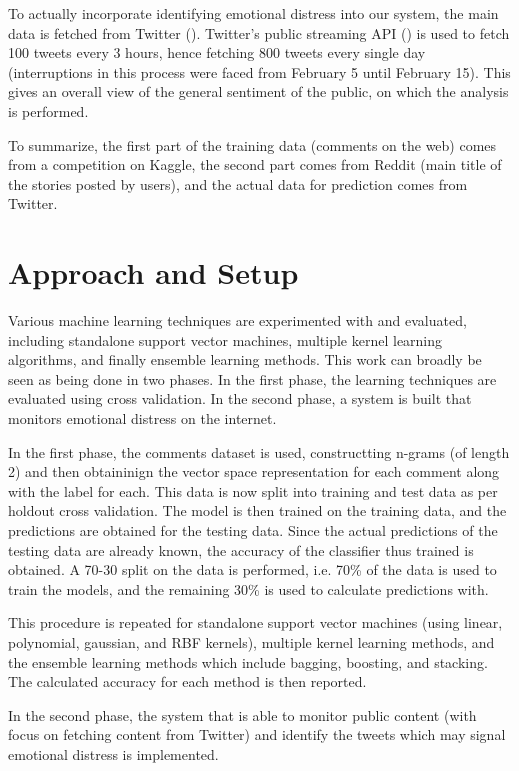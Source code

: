To actually incorporate identifying emotional distress into our system, the main data is fetched from Twitter (\cite{twitter}). Twitter's public streaming API (\cite{twitter_streaming_api}) is used to fetch 100 tweets every 3 hours, hence fetching 800 tweets every single day (interruptions in this process were faced from February 5 until February 15). This gives an overall view of the general sentiment of the public, on which the analysis is performed.

To summarize, the first part of the training data (comments on the web) comes from a competition on Kaggle, the second part comes from Reddit (main title of the stories posted by users), and the actual data for prediction comes from Twitter.

\section{Approach and Setup}
Various machine learning techniques are experimented with and evaluated, including standalone support vector machines, multiple kernel learning algorithms, and finally ensemble learning methods. This work can broadly be seen as being done in two phases. In the first phase, the learning techniques are evaluated using cross validation. In the second phase, a system is built that monitors emotional distress on the internet.

In the first phase, the comments \cite{kaggle} dataset is used, constructting n-grams (of length 2) and then obtaininign the vector space representation for each comment along with the label for each. This data is now split into training and test data as per holdout cross validation. The model is then trained on the training data, and the predictions are obtained for the testing data. Since the actual predictions of the testing data are already known, the accuracy of the classifier thus trained is obtained. A 70-30 split on the data is performed, i.e. 70\% of the data is used to train the models, and the remaining 30\% is used to calculate predictions with.

This procedure is repeated for standalone support vector machines (using linear, polynomial, gaussian, and RBF kernels), multiple kernel learning methods, and the ensemble learning methods which include bagging, boosting, and stacking. The calculated accuracy for each method is then reported.

In the second phase, the system that is able to monitor public content (with focus on fetching content from Twitter) and identify the tweets which may signal emotional distress is implemented.

